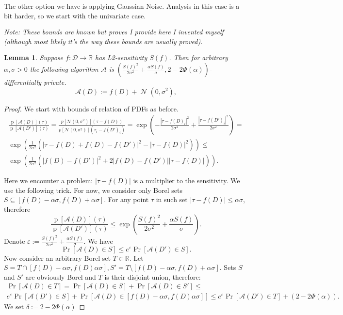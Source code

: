 \documentclass[12pt,letterpaper]{article}
\newcommand{\R}{\mathbb{R}}
\let\eps\varepsilon
\newcommand{\p}{\operatorname{p}}
\newtheorem{lemma}{Lemma}
\newcommand{\No}{\mathcal{N}}
\begin{document}
The other option we have is applying Gaussian Noise. Analysis in this case is a bit harder, so we start with the univariate case.

{\it Note: These bounds are known but proves I provide here I invented myself (although most likely it's the way these bounds are usually proved).}
\begin{lemma}
  \label{lm:gaussian}
Suppose $f: \mathcal{D} \to \R$ has L2-sensitivity $S(f)$. Then for arbitrary $\alpha, \sigma > 0$ the following algorithm $\mathcal{A}$ is $\left(\frac{S(f)^2}{2\sigma^2} + \frac{\alpha S(f)}{\sigma}, 2 - 2\Phi(\alpha)\right)$-differentially private.
$$\mathcal{A}(D) := f(D) + \operatorname{\No}(0, \sigma^2),$$
\end{lemma}
\begin{proof}
  We start with bounds of relation of PDFs as before.
  \begin{multline*}
    \frac{\p[\mathcal{A}(D)](\tau)}{\p[\mathcal{A}(D')](\tau)} = 
    \frac{p[\No(0, \sigma^2)](\tau - f(D))}{p[\No(0,\sigma^2)](\tau_i - f(D')_i)} = 
    \exp\left(-\frac{|\tau - f(D)_i|^2}{2\sigma^2} + \frac{|\tau - f(D')_i|^2}{2\sigma^2}\right) = \\
    \exp\left(\frac{1}{2\sigma^2}(|\tau - f(D) + f(D) - f(D')|^2 - |\tau - f(D)|^2)\right) \leq \\
    \exp\left(\frac{1}{2\sigma^2}(|f(D) - f(D')|^2 + 2|f(D) - f(D')||\tau - f(D)|)\right).
\end{multline*}

Here we encounter a problem: $|\tau - f(D)|$ is a multiplier to the sensitivity. We use the following trick.
For now, we consider only Borel sets $S \subseteq [f(D) - \alpha\sigma, f(D) + \alpha\sigma]$.
For any point $\tau$ in such set $|\tau - f(D)| \leq \alpha\sigma$, therefore 
$$\frac{\p[\mathcal{A}(D)](\tau)}{\p[\mathcal{A}(D')](\tau)} \leq \exp(\frac{S(f)^2}{2\sigma^2} + \frac{\alpha S(f)}{\sigma}).$$
Denote $\eps := \frac{S(f)^2}{2\sigma^2} + \frac{\alpha S(f)}{\sigma}$. We have
$$\Pr[\mathcal{A}(D) \in S] \leq e^{\eps} \Pr[\mathcal{A}(D') \in S].$$
Now consider an arbitrary Borel set $T \in \R$. Let $S = T \cap [f(D) -\alpha\sigma, f(D)\alpha\sigma], S' = T \setminus [f(D) - \alpha\sigma, f(D) + \alpha\sigma]$. Sets $S$ and $S'$ are obviously Borel and $T$ is their disjoint union, therefore:
\begin{multline*}
\Pr[\mathcal{A}(D) \in T] = \Pr[\mathcal{A}(D) \in S] + \Pr[\mathcal{A}(D) \in S'] \leq \\
e^\eps \Pr[\mathcal{A}(D') \in S] + \Pr[\mathcal{A}(D) \in [f(D) -\alpha\sigma, f(D)\alpha\sigma]] \leq e^{\eps} \Pr[\mathcal{A}(D') \in T] + (2 - 2\Phi(\alpha)).
\end{multline*}
We set $\delta := 2 - 2\Phi(\alpha)$
\end{proof}
\end{document}
